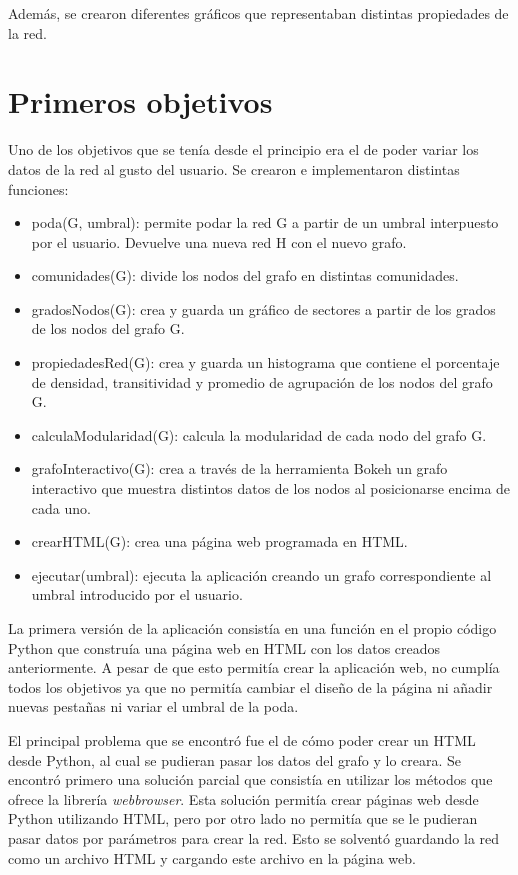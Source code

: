 Además, se crearon diferentes gráficos que representaban distintas propiedades de la red.

\section{Primeros objetivos}
Uno de los objetivos que se tenía desde el principio era el de poder variar los datos de la red al gusto del usuario. Se crearon e implementaron distintas funciones:
\begin{itemize}
    \item poda(G, umbral): permite podar la red G a partir de un umbral interpuesto por el usuario. Devuelve una nueva red H con el nuevo grafo.
    \item comunidades(G): divide los nodos del grafo en distintas comunidades.
    \item gradosNodos(G): crea y guarda un gráfico de sectores a partir de los grados de los nodos del grafo G.
    \item propiedadesRed(G): crea y guarda un histograma que contiene el porcentaje de densidad, transitividad y promedio de agrupación de los nodos del grafo G.
    \item calculaModularidad(G): calcula la modularidad de cada nodo del grafo G.
    \item grafoInteractivo(G): crea a través de la herramienta Bokeh un grafo interactivo que muestra distintos datos de los nodos al posicionarse encima de cada uno.
    \item crearHTML(G): crea una página web programada en HTML.
    \item ejecutar(umbral): ejecuta la aplicación creando un grafo correspondiente al umbral introducido por el usuario. 
\end{itemize}

La primera versión de la aplicación consistía en una función en el propio código Python que construía una página web en HTML con los datos creados anteriormente. A pesar de que esto permitía crear la aplicación web, no cumplía todos los objetivos ya que no permitía cambiar el diseño de la página ni añadir nuevas pestañas ni variar el umbral de la poda.

El principal problema que se encontró fue el de cómo poder crear un HTML desde Python, al cual se pudieran pasar los datos del grafo y lo creara. Se encontró primero una solución parcial que consistía en utilizar los métodos que ofrece la librería \textit{webbrowser}. Esta solución permitía crear páginas web desde Python utilizando HTML, pero por otro lado no permitía que se le pudieran pasar datos por parámetros para crear la red. Esto se solventó guardando la red como un archivo HTML y cargando este archivo en la página web.

